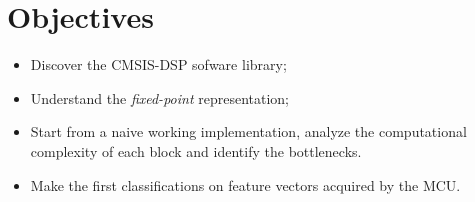 \section*{Objectives}

\begin{itemize}
    \item Discover the CMSIS-DSP sofware library;
    \item Understand the \emph{fixed-point} representation;
    \item Start from a naive working implementation, analyze the computational complexity of each block and identify the bottlenecks.
    \item Make the first classifications on feature vectors acquired by the MCU.
\end{itemize}
